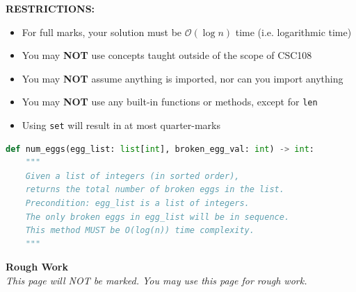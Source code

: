 \documentclass[letterpaper,12pt,addpoints]{exam}
\begin{document}
\begin{questions}
    \begin{center}
        \textbf{RESTRICTIONS:}
        \begin{itemize}
            \item For full marks, your solution must be $\mathcal{O}(\log n)$ time (i.e.
                  logarithmic time)
            \item You may \textbf{NOT} use concepts taught outside of the scope of CSC108
            \item You may \textbf{NOT} assume anything is imported, nor can you import anything
            \item You may \textbf{NOT} use any built-in functions or methods, except for
                  \texttt{len}
            \item Using \texttt{set} will result in at most quarter-marks
        \end{itemize}
    \end{center}
    \begin{lstlisting}[language=Python, style=mystyle]
def num_eggs(egg_list: list[int], broken_egg_val: int) -> int:
    """
    Given a list of integers (in sorted order),
    returns the total number of broken eggs in the list.
    Precondition: egg_list is a list of integers.
    The only broken eggs in egg_list will be in sequence.
    This method MUST be O(log(n)) time complexity.
    """
    \end{lstlisting}
    \clearpage
\end{questions}

\clearpage
\begin{center}
    \textbf{Rough Work}\\
    \textit{This page will NOT be marked. You may use this page for rough work.}
\end{center}
\end{document}
